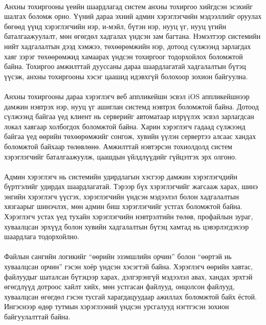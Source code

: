 \paragraph{}
Анхны тохиргооны үеийн шаардлагад систем анхны тохиргоо хийгдсэн эсэхийг шалгах боломж орно. Үүний дараа эхний админ хэрэглэгчийн мэдээллийг оруулах бөгөөд үүнд хэрэглэгчийн нэр, и-мэйл, бүтэн нэр, нууц үг, нууц үгийн баталгаажуулалт, мөн өгөгдөл хадгалах үндсэн зам багтана. Нэмэлтээр системийн нийт хадгалалтын дээд хэмжээ, төхөөрөмжийн нэр, дотоод сүлжээнд зарлагдах хаяг зэрэг төхөөрөмжид хамаарах үндсэн тохиргоог тодорхойлох боломжтой байна. Тохиргоо амжилттай дууссаны дараа шаардлагатай хадгалалтын бүтэц үүсэж, анхны тохиргооны хэсэг цаашид идэвхгүй болохоор зохион байгуулна.

\paragraph{}
Анхны тохиргооны дараа хэрэглэгч веб аппликейшн эсвэл iOS аппликейшнээр дамжин нэвтрэх нэр, нууц үг ашиглан системд нэвтрэх боломжтой байна. Дотоод сүлжээнд байгаа үед клиент нь серверийг автоматаар илрүүлэх эсвэл зарлагдсан локал хаягаар холбогдох боломжтой байна. Харин хэрэглэгч гадаад сүлжээнд байгаа үед өөрийн төхөөрөмжийг сонгож, хувийн үүлэн сервертээ алсаас хандах боломжтой байхаар төлөвлөнө. Амжилттай нэвтэрсэн тохиолдолд систем хэрэглэгчийг баталгаажуулж, цаашдын үйлдлүүдийг гүйцэтгэх эрх олгоно.

\paragraph{}
Админ хэрэглэгч нь системийн удирдлагын хэсгээр дамжин хэрэглэгчдийн бүртгэлийг удирдах шаардлагатай. Тэрээр бүх хэрэглэгчийг жагсааж харах, шинэ энгийн хэрэглэгч үүсгэх, хэрэглэгчийн үндсэн мэдээлэл болон хадгалалтын хязгаарыг шинэчлэх, мөн админ биш хэрэглэгчийг устгах боломжтой байна. Хэрэглэгч устах үед тухайн хэрэглэгчийн нэвтрэлтийн төлөв, профайлын зураг, хуваалцсан эрхүүд болон хувийн хадгалалтын бүтэц хамтад нь цэвэрлэгдэхээр шаардлага тодорхойлно.

\paragraph{}
Файлын сангийн логикийг ``өөрийн эзэмшлийн орчин'' болон ``өөртэй нь хуваалцсан орчин'' гэсэн хоёр үндсэн хэсэгтэй байна. Хэрэглэгч өөрийн хавтас, файлуудыг шаталсан бүтэцээр харах, дэлгэрэнгүй мэдээлэл авах, хандах эрхтэй өгөгдлүүд дотроос хайлт хийх, мөн устгасан файлууд, онцолсон файлууд, хуваалцсан өгөгдөл гэсэн тусгай харагдацуудаар ажиллах боломжтой байх ёстой. Ингэснээр өдөр тутмын хэрэглээний үндсэн урсгалууд нэгтгэсэн зохион байгуулалттай байна.

